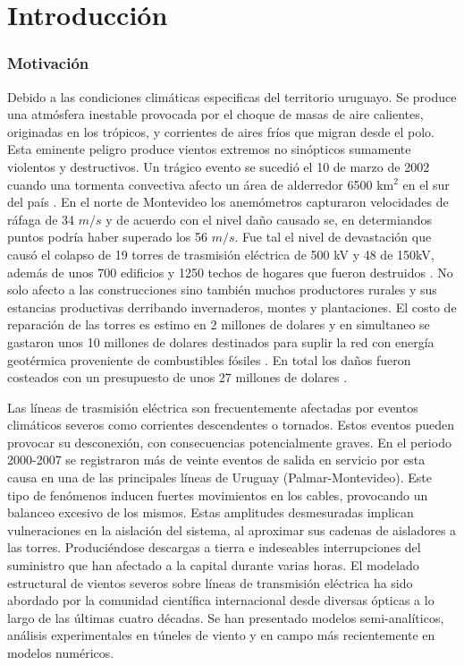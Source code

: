 \chapter{Introducción}\label{Cap:Introduccion}
 
\subsection{Motivación}
\linenumbers


Debido a las condiciones climáticas especificas del territorio uruguayo. Se produce una atmósfera inestable provocada por el choque de masas de aire calientes, originadas en los trópicos, y corrientes de aires fríos que migran desde el polo. Esta eminente peligro produce vientos extremos no sinópticos sumamente violentos y destructivos. Un trágico evento se sucedió el 10 de marzo de 2002 cuando una tormenta convectiva afecto un área de alderredor 6500 km$^2$ en el sur del país \cite{DNM2002}. En el norte de Montevideo los anemómetros capturaron velocidades de ráfaga de 34 $m/s$ y de acuerdo con el nivel daño causado se, en determiandos puntos podría haber superado los 56 $m/s$. Fue tal el nivel de devastación que causó el colapso de 19 torres de trasmisión eléctrica de 500 kV y 48 de 150kV, además de unos 700 edificios y 1250 techos de hogares que fueron destruidos \citep{duranona2015significance}. No solo afecto a las construcciones sino también muchos productores rurales y sus estancias productivas derribando invernaderos, montes y plantaciones. El costo de reparación de las torres es estimo en 2 millones de dolares y en simultaneo se gastaron unos 10 millones de dolares destinados para suplir la red con energía geotérmica proveniente de combustibles fósiles . En total los daños fueron costeados con un presupuesto de unos 27 millones de dolares \cite{duranona2019first}.

Las líneas de trasmisión eléctrica son frecuentemente afectadas por eventos climáticos severos como corrientes descendentes o tornados. Estos eventos pueden provocar su desconexión, con consecuencias potencialmente graves. En el periodo 2000-2007 se registraron más de veinte eventos de salida en servicio por esta causa en una de las principales líneas de Uruguay (Palmar-Montevideo). Este tipo de fenómenos inducen fuertes movimientos en los cables, provocando un balanceo excesivo de los mismos. Estas amplitudes desmesuradas implican vulneraciones en la aislación del sistema, al aproximar sus cadenas de aisladores a las torres. Produciéndose descargas a tierra e indeseables interrupciones del suministro que han afectado a la capital durante varias horas. El modelado estructural de vientos severos sobre líneas de transmisión eléctrica ha sido abordado por la comunidad científica internacional desde diversas ópticas a lo largo de las últimas cuatro décadas. Se han presentado modelos semi-analíticos, análisis experimentales en túneles de viento y en campo más recientemente en modelos numéricos.
 
